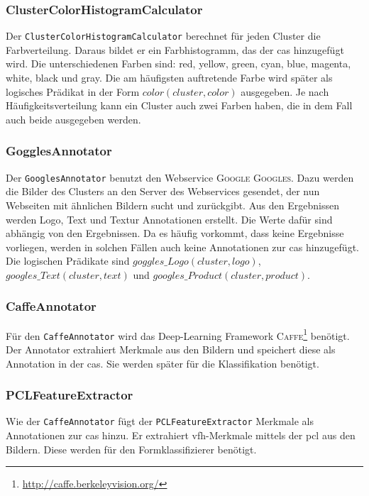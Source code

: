 \subsubsection{ClusterColorHistogramCalculator}
Der \texttt{ClusterColorHistogramCalculator} berechnet für jeden Cluster die Farbverteilung. Daraus bildet er ein Farbhistogramm, das der \gls{cas} hinzugefügt wird. Die unterschiedenen Farben sind: red, yellow, green, cyan, blue, magenta, white, black und gray. Die am häufigsten auftretende Farbe wird später als logisches Prädikat in der Form $color(cluster,  color)$ ausgegeben. Je nach Häufigkeitsverteilung kann ein Cluster auch zwei Farben haben, die in dem Fall auch beide ausgegeben werden. 

\subsubsection{GogglesAnnotator}
Der \texttt{GooglesAnnotator} benutzt den Webservice \textsc{Google Googles}. Dazu werden die Bilder des Clusters an den Server des Webservices gesendet, der nun Webseiten mit ähnlichen Bildern sucht und zurückgibt. Aus den Ergebnissen werden Logo, Text und Textur Annotationen erstellt. Die Werte dafür sind abhängig von den Ergebnissen. Da es häufig vorkommt, dass keine Ergebnisse vorliegen, werden in solchen Fällen auch keine Annotationen zur \gls{cas} hinzugefügt. Die logischen Prädikate sind $goggles\_Logo(cluster, logo)$, $googles\_Text(cluster, text)$ und $googles\_Product(cluster, product)$. 

\subsubsection{CaffeAnnotator}
\label{sec:caffeAnno}
Für den \texttt{CaffeAnnotator} wird das Deep-Learning Framework \textsc{Caffe}\footnote{\url{http://caffe.berkeleyvision.org/}} benötigt. Der Annotator extrahiert Merkmale aus den Bildern und speichert diese als Annotation in der \gls{cas}. Sie werden später für die Klassifikation benötigt.  

\subsubsection{PCLFeatureExtractor}
Wie der \texttt{CaffeAnnotator} fügt der \texttt{PCLFeatureExtractor} Merkmale als Annotationen zur \gls{cas} hinzu. Er extrahiert \gls{vfh}-Merkmale mittels der \gls{pcl} aus den Bildern. Diese werden für den Formklassifizierer benötigt.

